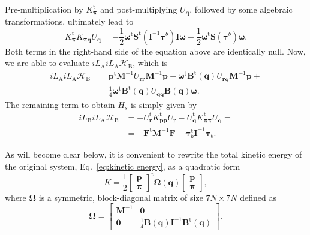 \documentclass[
journal=jctcce,
layout=twocolumn
]{achemso}
\newcommand{\mt}[1]{\boldsymbol{\mathbf{#1}}}   %
\newcommand{\vt}[1]{\boldsymbol{\mathbf{#1}}}   %
\newcommand{\tr}[1]{#1^\text{t}}                %
\newcommand{\Ham}[1]{{\mathcal H}_\text{#1}}    %
\newcommand{\Liu}[1]{i\!L_\text{#1}}            %
\begin{document}
Pre-multiplication by $\tr{K_{\vt \pi}}$ and post-multiplying $U_{\vt q}$, followed by some algebraic transformations, ultimately lead to
\begin{equation*}
\tr{K_{\vt \pi}} K_{\vt \pi \vt q} U_{\vt q} = -\frac{1}{2} \tr{\vt \omega} \tr{\mt S}({\mt I}^{-1} {\vt \tau}^b) {\mt I} {\vt \omega} + \frac{1}{2} \tr{\vt \omega} {\mt S}({\vt \tau}^b){\vt \omega}.
\end{equation*}
Both terms in the right-hand side of the equation above are identically null. 
Now, we are able to evaluate $\Liu A \Liu A \Ham B $, which is
\begin{align*}
\Liu A \Liu A \Ham B = &\tr{\vt p} {\mt M}^{-1} U_{\vt r \vt r} {\mt M}^{-1} {\vt p} + \tr{\vt \omega} \tr{\mt B}(\vt q) U_{\vt r \vt q} {\mt M}^{-1} {\vt p}
+ \\
&\frac{1}{4} \tr{\vt \omega} \tr{\mt B}(\vt q) U_{\vt q \vt q} {\mt B}(\vt q) \vt \omega.
\end{align*}
The remaining term to obtain $H_s$ is simply given by 
\begin{align*}
\Liu B \Liu A \Ham B &= -\tr{U_{\vt r}} \tr{K_{\vt p \vt p}} U_{\vt r} - \tr{U_{\vt q}} \tr{K_{\vt \pi \vt \pi}} U_{\vt q} = \\
&= -\tr{\vt F} {\mt M}^{-1} {\vt F} - \tr{\vt \tau}_b {\mt I}^{-1} {\vt \tau}_b.
\end{align*}

As will become clear below, it is convenient to rewrite the total kinetic energy of the original system, Eq.~\eqref{eq:kinetic energy}, as a quadratic form
\begin{equation*}
K = \frac{1}{2} \tr{ \left[\begin{array}{c} \vt p \\ \vt \pi \end{array}\right]} {\mt \Omega}(\vt q) \left[\begin{array}{c} \vt p \\ \vt \pi \end{array}\right],
\end{equation*}
where $\mt \Omega$ is a symmetric, block-diagonal matrix of size $7N \times 7N$ defined as
\begin{equation}
\label{eq:block-diagonal inverse mass tensor}
{\mt \Omega} = \left[\begin{array}{cc}
{\mt M}^{-1} & \mt 0 \\
\mt 0 & \frac{1}{4} {\mt B}(\vt q) {\mt I}^{-1} \tr{\mt B}(\vt q)
\end{array}\right].
\end{equation}
\end{document}
